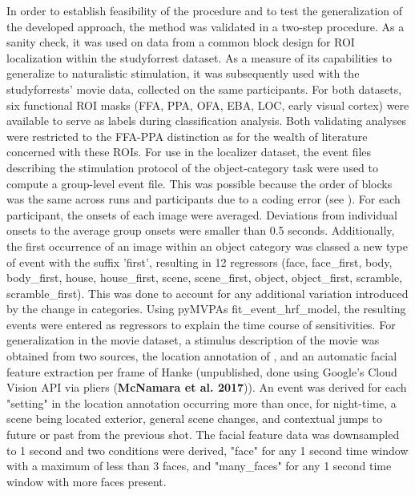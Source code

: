 \documentclass[a4paper, 12pt]{scrreprt}
\begin{document}
In order to establish feasibility of the procedure and to test the generalization of the developed approach, the method was validated in a two-step procedure. As a sanity check, it was used on data from a common block design for ROI localization within the studyforrest dataset. As a measure of its capabilities to generalize to naturalistic stimulation, it was subsequently used with the studyforrests' movie data, collected on the same participants. For both datasets, six functional ROI masks (FFA, PPA, OFA, EBA, LOC, early visual cortex) were available to serve as labels during classification analysis. Both validating analyses were restricted to the FFA-PPA distinction as for the wealth of literature concerned with these ROIs. \newline
For use in the localizer dataset, the event files describing the stimulation protocol of the object-category task were used to compute a group-level event file. This was possible because the order of blocks was the same across runs and participants due to a coding error (see \cite{sengupta2016studyforrest}). For each participant, the onsets of each image were averaged. Deviations from individual onsets to the average group onsets were smaller than 0.5 seconds. Additionally, the first occurrence of an image within an object category was classed a new type of event with the suffix 'first', resulting in 12 regressors (face, face\_first, body, body\_first, house, house\_first, scene, scene\_first, object, object\_first, scramble, scramble\_first). This was done to account for any additional variation introduced by the change in categories. Using pyMVPAs fit\_event\_hrf\_model, the resulting events were entered as regressors to explain the time course of sensitivities. \newline
For generalization in the movie dataset, a stimulus description of the movie was obtained from two sources, the location annotation of \textcite{hausler2016annotation}, and an automatic facial feature extraction per frame of Hanke (unpublished, done using Google's Cloud Vision API via pliers (\textbf{McNamara et al. 2017})). An event was derived for each "setting" in the location annotation occurring more than once, for night-time, a scene being located exterior, general scene changes, and contextual jumps to future or past from the previous shot. The facial feature data was downsampled to 1 second and two conditions were derived, "face" for any 1 second time window with a maximum of less than 3 faces, and "many\_faces" for any 1 second time window with more faces present.
\end{document}
